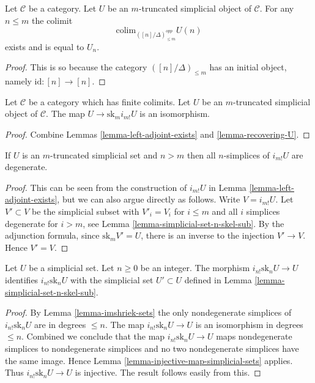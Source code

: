 \begin{lemma}
\label{lemma-recovering-U}
Let $\mathcal{C}$ be a category.
Let $U$ be an $m$-truncated simplicial object of $\mathcal{C}$.
For any $n \leq m$ the colimit
$$
\text{colim}_{([n]/\Delta)_{\leq m}^{opp}} U(n)
$$
exists and is equal to $U_n$.
\end{lemma}

\begin{proof}
This is so because the category $([n]/\Delta)_{\leq m}$
has an initial object, namely $\text{id} : [n] \to [n]$.
\end{proof}

\begin{lemma}
\label{lemma-recovering-U-for-real}
Let $\mathcal{C}$ be a category which has finite colimits.
Let $U$ be an $m$-truncated simplicial object of $\mathcal{C}$.
The map $U \to \text{sk}_m i_{m!}U$ is an isomorphism.
\end{lemma}

\begin{proof}
Combine Lemmas \ref{lemma-left-adjoint-exists} and \ref{lemma-recovering-U}.
\end{proof}

\begin{lemma}
\label{lemma-imshriek-sets}
If $U$ is an $m$-truncated simplicial set and $n > m$
then all $n$-simplices of $i_{m!}U$ are degenerate.
\end{lemma}

\begin{proof}
This can be seen from the construction of
$i_{m!}U$ in Lemma \ref{lemma-left-adjoint-exists},
but we can also argue directly as follows.
Write $V = i_{m!}U$. Let $V' \subset V$ be the
simplicial subset with $V'_i = V_i$ for $i \leq m$
and all $i$ simplices degenerate for $i > m$,
see Lemma \ref{lemma-simplicial-set-n-skel-sub}.
By the adjunction formula,
since $\text{sk}_m V' = U$, there is an inverse to the
injection $V' \to V$. Hence $V' = V$.
\end{proof}

\begin{lemma}
\label{lemma-n-skeletion-sets}
Let $U$ be a simplicial set.
Let $n \geq 0$ be an integer.
The morphism $i_{n!} \text{sk}_n U \to U$ identifies
$i_{n!} \text{sk}_n U$ with the simplicial set
$U' \subset U$ defined in Lemma \ref{lemma-simplicial-set-n-skel-sub}.
\end{lemma}

\begin{proof}
By Lemma \ref{lemma-imshriek-sets} the only
nondegenerate simplices of $i_{n!} \text{sk}_n U$
are in degrees $\leq n$. The map
$i_{n!} \text{sk}_n U \to U$ is an isomorphism
in degrees $\leq n$. Combined we conclude
that the map $i_{n!} \text{sk}_n U \to U$ maps
nondegenerate simplices to nondegenerate simplices
and no two nondegenerate simplices have the same image.
Hence Lemma \ref{lemma-injective-map-simplicial-sets} applies.
Thus $i_{n!} \text{sk}_n U \to U$
is injective. The result follows easily from this.
\end{proof}

